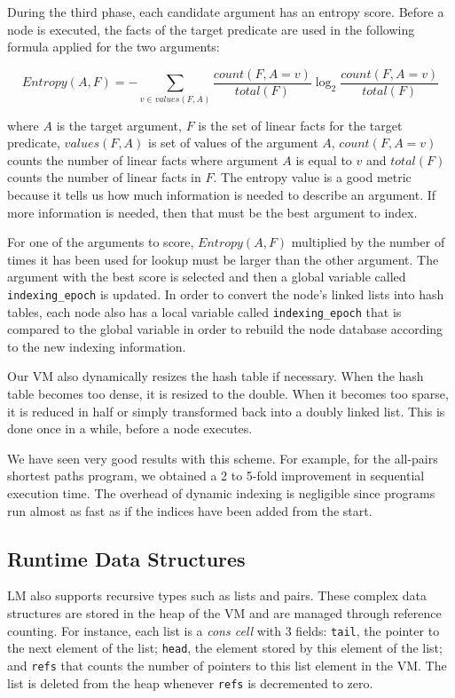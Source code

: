 \documentclass{sigplanconf}
\begin{document}
During the third phase, each candidate argument has an entropy score.
Before a node is executed, the facts of the target predicate
are used in the following formula applied for the two arguments:

{\tiny
\[
Entropy(A, F) = - \sum_{v \in values(F, A)} \frac{count(F, A = v)}{total(F)} \log_2 \frac{count(F, A = v)}{total(F)}
\]
}

\noindent
where $A$ is the target argument, $F$ is the set of linear facts
for the target predicate, $values(F, A)$ is set of values of the
argument $A$, $count(F, A = v)$ counts the number of linear facts
where argument $A$ is equal to $v$ and $total(F)$ counts the number of
linear facts in $F$.  The entropy value is a good metric because it
tells us how much information is needed to describe an argument.  If
more information is needed, then that must be the best argument to
index.

For one of the arguments to score, $Entropy(A, F)$ multiplied by the
number of times it has been used for lookup must be larger than the
other argument. The argument with the best score is selected and then
a global variable called \texttt{indexing\_epoch} is updated.  In
order to convert the node's linked lists into hash tables, each node
also has a local variable called \texttt{indexing\_epoch} that is
compared to the global variable in order to rebuild the node database
according to the new indexing information.

Our VM also dynamically resizes the hash table if necessary. When the
hash table becomes too dense, it is resized to the double. When it
becomes too sparse, it is reduced in half or simply transformed back
into a doubly linked list. This is done once in a while, before a node
executes.

We have seen very good results with this scheme. For example, for the
all-pairs shortest paths program, we obtained a 2 to 5-fold
improvement in sequential execution time.  The overhead of dynamic
indexing is negligible since programs run almost as fast as if the
indices have been added from the start.


\subsection{Runtime Data Structures}

LM also supports recursive types such as lists and pairs. These
complex data structures are stored in the heap of the VM and are
managed through reference counting. For instance, each list is
a \emph{cons cell} with 3 fields: \texttt{tail}, the pointer to the
next element of the list; \texttt{head}, the element stored by this
element of the list; and \texttt{refs} that counts the number of
pointers to this list element in the VM. The list is deleted from the
heap whenever \texttt{refs} is decremented to zero.
\end{document}
